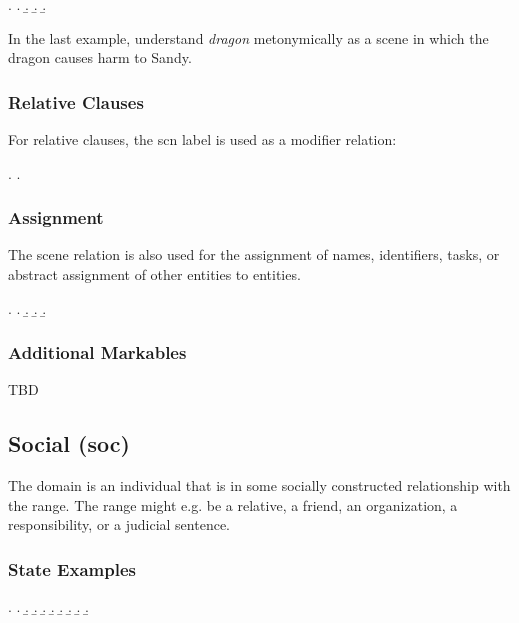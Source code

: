 \documentclass[a4paper]{article}
\begin{document}
\ex. \a. 
     \b. 
     \b. 
     \b. 

In the last example, understand \emph{dragon} metonymically as a scene in which
the dragon causes harm to Sandy.

\subsubsection{Relative Clauses}

For relative clauses, the \textsf{scn} label is used as a modifier relation:

\ex. \a. 

\subsubsection{Assignment}

The scene relation is also used for the assignment of names, identifiers,
tasks, or abstract assignment of other entities to entities.

\ex.
\a. 
\b. 
\b. 
\b. 

\subsubsection{Additional Markables}

TBD

\clearpage
\subsection{Social (\textsf{soc})}
\label{sec:soc}

The domain is an individual that is in some socially constructed relationship with the range. The range might e.g. be a relative, a friend, an organization, a responsibility, or a judicial sentence.

\subsubsection{State Examples}

\ex. \a. 
     \b. 
     \b. 
     \b. 
     \b. 
     \b. 
     \b. 
     \b. 
     \b. 
\end{document}
